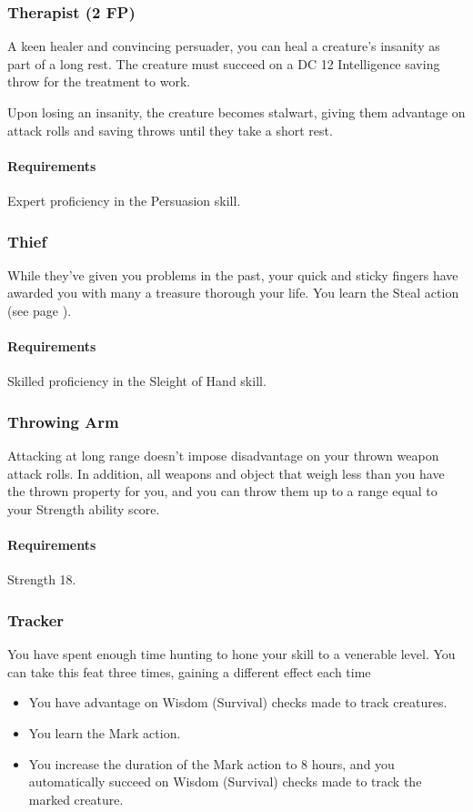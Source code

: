 \subsubsection{Therapist (2 FP)} \label{feat::therapist}
    A keen healer and convincing persuader, you can heal a creature's insanity as part of a long rest.
    The creature must succeed on a DC 12 Intelligence saving throw for the treatment to work.

    Upon losing an insanity, the creature becomes stalwart, giving them advantage on attack rolls and saving throws until they take a short rest.
    \paragraph{Requirements} Expert proficiency in the Persuasion skill.
\subsubsection{Thief} \label{feat::thief}
    While they've given you problems in the past, your quick and sticky fingers have awarded you with many a treasure thorough your life.
    You learn the Steal action (see page \pageref{act::steal}).
    \paragraph{Requirements} Skilled proficiency in the Sleight of Hand skill.
\subsubsection{Throwing Arm} \label{feat::throwingarm}
    Attacking at long range doesn't impose disadvantage on your thrown weapon attack rolls.
    In addition, all weapons and object that weigh less than you have the thrown property for you, and you can throw them up to a range equal to your Strength ability score.
    \paragraph{Requirements} Strength 18.
\subsubsection{Tracker} \label{feat::tracker}
    You have spent enough time hunting to hone your skill to a venerable level.
    You can take this feat three times, gaining a different effect each time
    \begin{itemize}
        \item You have advantage on Wisdom (Survival) checks made to track creatures.
        \item You learn the Mark action.
        \item You increase the duration of the Mark action to 8 hours, and you automatically succeed on Wisdom (Survival) checks made to track the marked creature.
    \end{itemize}
